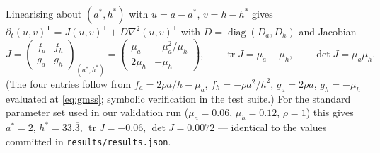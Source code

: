 Linearising about $(a^\ast, h^\ast)$ with $u = a - a^\ast$, $v = h - h^\ast$
gives $\partial_t (u,v)^{\mathsf T} = J (u,v)^{\mathsf T} + D \nabla^2
(u,v)^{\mathsf T}$ with $D = \operatorname{diag}(D_a, D_h)$ and Jacobian
\begin{equation}
J = \begin{pmatrix} f_a & f_h \\ g_a & g_h \end{pmatrix}_{(a^\ast,h^\ast)}
  = \begin{pmatrix} \mu_a & -\mu_a^2/\mu_h \\[2pt] 2\mu_h & -\mu_h \end{pmatrix},
\qquad
\operatorname{tr} J = \mu_a - \mu_h, \qquad
\det J = \mu_a \mu_h .
\label{eq:jacobian}
\end{equation}
(The four entries follow from $f_a = 2\rho a/h - \mu_a$, $f_h = -\rho a^2/h^2$,
$g_a = 2\rho a$, $g_h = -\mu_h$ evaluated at \eqref{eq:gmss}; symbolic
verification in the test suite.) For the standard parameter set used in our
validation run ($\mu_a = 0.06$, $\mu_h = 0.12$, $\rho = 1$) this gives
$a^\ast = 2$, $h^\ast = 33.\overline{3}$, $\operatorname{tr} J = -0.06$,
$\det J = 0.0072$ --- identical to the values committed in
\texttt{results/results.json}.

